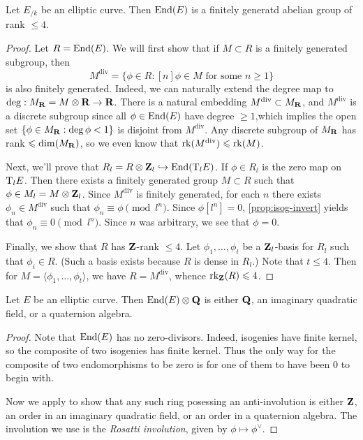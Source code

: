 \begin{proposition}\label{prop:end-rank}
Let $E_{/k}$ be an elliptic curve. Then $\operatorname{End}(E)$ is a finitely generatd 
abelian group of rank $\leqslant 4$. 
\end{proposition}
\begin{proof}
Let $R=\operatorname{End}(E)$. We will first show that if $M\subset R$ is a finitely 
generated subgroup, then 
\[
  M^\mathrm{div}=\{\phi\in R:[n]\phi\in M\text{ for some } n\geqslant 1\} 
\]
is also finitely generated. Indeed, we can naturally extend the degree map 
to $\deg:M_{\mathbf{R}}=M\otimes \mathbf{R}\to \mathbf{R}$. There is a natural embedding 
$M^\mathrm{div}\subset M_{\mathbf{R}}$, and $M^\mathrm{div}$ is a discrete subgroup 
since all $\phi\in \operatorname{End}(E)$ have degree $\geqslant 1$,which implies the 
open set $\{\phi\in M_{\mathbf{R}}:\deg\phi<1\}$ is disjoint from $M^\mathrm{div}$. 
Any discrete subgroup of $M_{\mathbf{R}}$ has rank $\leqslant \dim(M_{\mathbf{R}})$, so we 
even know that $\operatorname{rk}(M^\mathrm{div})\leqslant \operatorname{rk}(M)$. 

Next, we'll prove that $R_l=R\otimes \mathbf{Z}_l\hookrightarrow \operatorname{End}(\mathrm{T}_l E)$. If 
$\phi\in R_l$ is the zero map on $\mathrm{T}_l E$. Then there exists a finitely 
generated group $M\subset R$ such that $\phi\in M_l=M\otimes \mathbf{Z}_l$. Since 
$M^\mathrm{div}$ is finitely generated, for each $n$ there exists 
$\phi_n\in M^\mathrm{div}$ such that $\phi_n\equiv \phi\pmod{l^n}$. Since 
$\phi[l^n]=0$, \autoref{prop:isog-invert} yields that 
$\phi_n\equiv 0\pmod{l^n}$. Since $n$ was arbitrary, we see that $\phi=0$. 

Finally, we show that $R$ has $\mathbf{Z}$-rank $\leqslant 4$. Let 
$\phi_1,\dots,\phi_t$ be a $\mathbf{Z}_l$-basis for $R_l$ such that 
$\phi_i\in R$. (Such a basis exists because $R$ is dense in $R_l$.) Note that 
$t\leqslant 4$. Then for $M=\langle \phi_1,\dots,\phi_t\rangle$, we have 
$R=M^\mathrm{div}$, whence $\operatorname{rk}_{\mathbf{Z}}(R)\leqslant 4$. 
\end{proof}

\begin{proposition}
Let $E$ be an elliptic curve. Then $\operatorname{End}(E)\otimes\mathbf{Q}$ is either $\mathbf{Q}$, 
an imaginary quadratic field, or a quaternion algebra. 
\end{proposition}
\begin{proof}
Note that $\operatorname{End}(E)$ has no zero-divisors. Indeed, isogenies have finite 
kernel, so the composite of two isogenies has finite kernel. Thus the only 
way for the composite of two endomorphisms to be zero is for one of them to 
have been $0$ to begin with. 

Now we apply \cite[III 9.3]{silverman-2009} to show that any such ring 
posessing an anti-involution is either $\mathbf{Z}$, an order in an imaginary 
quadratic field, or an order in a quaternion algebra. The involution we use 
is the \emph{Rosatti involution}, given by $\phi\mapsto \phi^\vee$. 
\end{proof}


